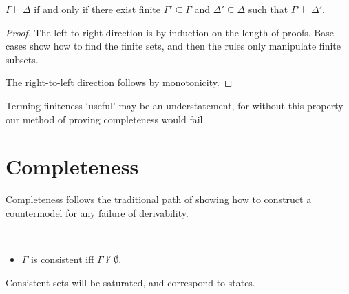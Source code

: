 \documentclass[10pt]{article}
\begin{document}
\begin{proposition}[Finiteness]\label{prop:finiteness}
  \(\Gamma \vdash \Delta\) if and only if there exist finite \(\Gamma' \subseteq \Gamma\) and \(\Delta' \subseteq \Delta\) such that \(\Gamma' \vdash \Delta'\).
  \begin{proof}
    The left-to-right direction is by induction on the length of proofs.
    Base cases show how to find the finite sets, and then the rules only manipulate finite subsets.

    The right-to-left direction follows by monotonicity.
  \end{proof}
\end{proposition}

Terming finiteness `useful' may be an understatement, for without this property our method of proving completeness would fail.

\newpage

\section{Completeness}
\label{sec:completeness-ideas}

Completeness follows the traditional path of showing how to construct a countermodel for any failure of derivability.

\begin{definition}[Consistency]
  \mbox{ }
  \begin{itemize}
  \item \(\Gamma\) is consistent iff \(\Gamma \nvdash \emptyset\).
  \end{itemize}
\end{definition}

Consistent sets will be saturated, and correspond to states.
\end{document}
